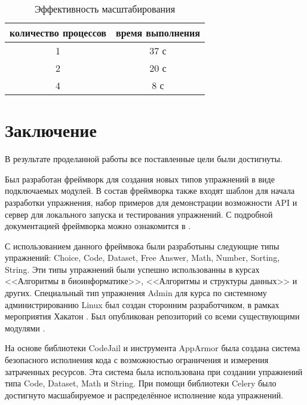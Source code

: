 \documentclass{matmex-diploma-custom}
\begin{document}
\begin{table}[h]
  \centering
\begin{tabular}{|c|c|}
  \hline
  количество процессов & время выполнения \\
  \hline
  1 & 37 с \\
  2 & 20 с \\
  4 & 8 с \\
  \hline
\end{tabular}
  \caption{Эффективность масштабирования}
  \label{table:scal}
\end{table}

\iffalse
#+ORGTBL: SEND scal orgtbl-to-latex :splice nil :skip 0
|----------------------+------------------|
| количество процессов | время выполнения |
|----------------------+------------------|
|                    1 | 37 с             |
|                    2 | 20 с             |
|                    4 | 8 с              |
|----------------------+------------------|
\fi


\section*{Заключение}
В результате проделанной работы все поставленные цели были достигнуты.

Был разработан фреймворк для создания новых типов упражнений в виде
подключаемых модулей. В состав фреймворка также входят шаблон для
начала разработки упражнения, набор примеров для демонстрации
возможности API и сервер для локального запуска и тестирования
упражнений. С подробной документацией фреймворка можно ознакомится в
\cite{plugins:doc}.

С использованием данного фреймвока были разработыны следующие типы
упражнений: Choice, Code, Dataset, Free Answer, Math, Number, Sorting,
String. Эти типы упражнений были успешно использованны в курсах
<<Алгоритмы в биоинформатике>>, <<Алгоритмы и структуры данных>> и
других. Специальный тип упражнения Admin для курса по системному
администрированию Linux был создан сторонним разработчиком, в рамках
мероприятия Хакатон \cite{hackaton}. Был опубликован репозиторий со
всеми существующими модулями \cite{plugins:repo}.

На основе библиотеки CodeJail и инструмента AppArmor была создана
система безопасного исполнения кода с возможностью ограничения и
измерения затраченных ресурсов. Эта система была использована при
создании упражнений типа Code, Dataset, Math и String. При помощи
библиотеки Celery было достигнуто масшабируемое и распределённое
исполнение кода упражнений.

\clearpage
{}


\end{document}
